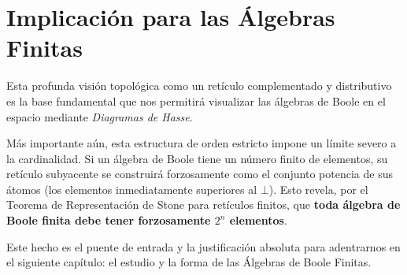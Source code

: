 \section{Implicación para las Álgebras Finitas}
Esta profunda visión topológica como un retículo complementado y distributivo es la base fundamental que nos permitirá visualizar las álgebras de Boole en el espacio mediante \textit{Diagramas de Hasse}. 

Más importante aún, esta estructura de orden estricto impone un límite severo a la cardinalidad. Si un álgebra de Boole tiene un número finito de elementos, su retículo subyacente se construirá forzosamente como el conjunto potencia de sus átomos (los elementos inmediatamente superiores al $\bot$). Esto revela, por el Teorema de Representación de Stone para retículos finitos, que \textbf{toda álgebra de Boole finita debe tener forzosamente $2^n$ elementos}. 

Este hecho es el puente de entrada y la justificación absoluta para adentrarnos en el siguiente capítulo: el estudio y la forma de las Álgebras de Boole Finitas.
